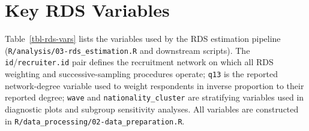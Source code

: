 \documentclass[
  12pt,
  letterpaper,
  DIV=11,
  numbers=noendperiod]{scrreprt}
\begin{document}
\section{Key RDS Variables}\label{sec-a-rds}

Table~\ref{tbl-rds-vars} lists the variables used by the RDS estimation
pipeline (\texttt{R/analysis/03-rds\_estimation.R} and downstream
scripts). The \texttt{id}/\texttt{recruiter.id} pair defines the
recruitment network on which all RDS weighting and successive-sampling
procedures operate; \texttt{q13} is the reported network-degree variable
used to weight respondents in inverse proportion to their reported
degree; \texttt{wave} and \texttt{nationality\_cluster} are stratifying
variables used in diagnostic plots and subgroup sensitivity analyses.
All variables are constructed in
\texttt{R/data\_processing/02-data\_preparation.R}.
\end{document}
